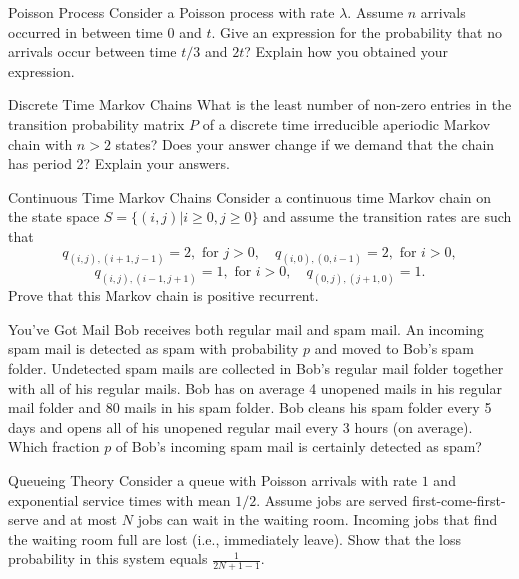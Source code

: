 \begin{problem}{Poisson Process}
Consider a Poisson process with rate $ \lambda$. Assume $n$ arrivals occurred in between time $0$ and $t$. Give an expression for the probability that no arrivals occur between time $t/3$ and $2t$? Explain how you obtained your expression.
\end{problem}

\begin{problem}{Discrete Time Markov Chains}
What is the least number of non-zero entries in the transition probability matrix $P$ of a discrete time irreducible aperiodic Markov chain with $n > 2$ states? Does your answer change if we demand that the chain has period 2? Explain your answers.
\end{problem}

\begin{problem}{Continuous Time Markov Chains}
Consider a continuous time Markov chain on the state space $S = \{(i, j)|i \geq 0, j \geq 0\}$ and assume the transition rates are such that
\[
q_{(i,j),(i+1,j-1)} = 2, \text{ for } j > 0, \quad
q_{(i,0),(0,i-1)} = 2, \text{ for } i > 0,
\]
\[
q_{(i,j),(i-1,j+1)} = 1, \text{ for } i > 0, \quad
q_{(0,j),(j+1,0)} = 1.
\]
Prove that this Markov chain is positive recurrent.
\end{problem}

\begin{problem}{You've Got Mail}
Bob receives both regular mail and spam mail. An incoming
spam mail is detected as spam with probability $p$ and moved to Bob’s spam folder.
Undetected spam mails are collected in Bob’s regular mail folder together with all of his
regular mails. Bob has on average 4 unopened mails in his regular mail folder and 80
mails in his spam folder. Bob cleans his spam folder every 5 days and opens all of his
unopened regular mail every 3 hours (on average). Which fraction $p$ of Bob’s incoming
spam mail is certainly detected as spam?
\end{problem}

\begin{problem}{Queueing Theory}
Consider a queue with Poisson arrivals with rate $1$ and exponential
service times with mean $1/2$. Assume jobs are served first-come-first-serve and at most
$N$ jobs can wait in the waiting room. Incoming jobs that find the waiting room full
are lost (i.e., immediately leave). Show that the loss probability in this system equals
$\frac{1}{2N + 1 - 1}$.
\end{problem}

